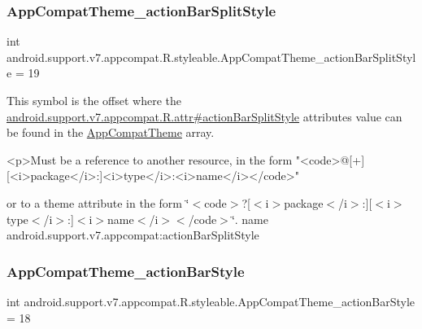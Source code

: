\subsubsection{\texorpdfstring{App\+Compat\+Theme\+\_\+action\+Bar\+Split\+Style}{AppCompatTheme\_actionBarSplitStyle}}
{\footnotesize\ttfamily int android.\+support.\+v7.\+appcompat.\+R.\+styleable.\+App\+Compat\+Theme\+\_\+action\+Bar\+Split\+Style = 19\hspace{0.3cm}{\ttfamily [static]}}

This symbol is the offset where the \hyperlink{classandroid_1_1support_1_1v7_1_1appcompat_1_1R_1_1attr_aaa2ad4da3570284af536385254d4ebaf}{android.\+support.\+v7.\+appcompat.\+R.\+attr\#action\+Bar\+Split\+Style} attribute\textquotesingle{}s value can be found in the \hyperlink{classandroid_1_1support_1_1v7_1_1appcompat_1_1R_1_1styleable_a5c42f89e8a410c323be34208d75c430b}{App\+Compat\+Theme} array.

\begin{DoxyVerb}      <p>Must be a reference to another resource, in the form "<code>@[+][<i>package</i>:]<i>type</i>:<i>name</i></code>"
\end{DoxyVerb}
 or to a theme attribute in the form \char`\"{}$<$code$>$?\mbox{[}$<$i$>$package$<$/i$>$\+:\mbox{]}\mbox{[}$<$i$>$type$<$/i$>$\+:\mbox{]}$<$i$>$name$<$/i$>$$<$/code$>$\char`\"{}.  name android.\+support.\+v7.\+appcompat\+:action\+Bar\+Split\+Style \mbox{\label{classandroid_1_1support_1_1v7_1_1appcompat_1_1R_1_1styleable_aff968b1e543d42c65c91979ff78e7eb9}} 
\subsubsection{\texorpdfstring{App\+Compat\+Theme\+\_\+action\+Bar\+Style}{AppCompatTheme\_actionBarStyle}}
{\footnotesize\ttfamily int android.\+support.\+v7.\+appcompat.\+R.\+styleable.\+App\+Compat\+Theme\+\_\+action\+Bar\+Style = 18\hspace{0.3cm}{\ttfamily [static]}}

